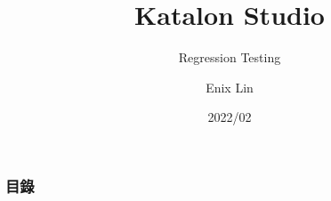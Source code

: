 \documentclass{beamer}
\author{Enix Lin}
\begin{document}
	\title{Katalon Studio}
	\subtitle{Regression Testing}
	\date{2022/02}
	\maketitle
	\begin{frame}[c]
		\label{Index}
		\frametitle{目錄}
		\tableofcontents
	\end{frame}
	
	
%	
	
	
\end{document}

